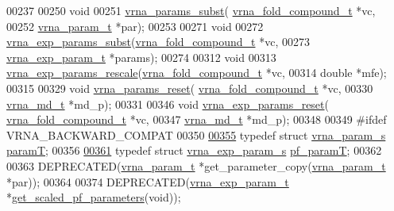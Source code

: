 \begin{DoxyCode}
00237 
00250 \textcolor{keywordtype}{void}
00251 \hyperlink{group__energy__parameters_ga5d1909208f7ea3baa98b75afaa1f62ca}{vrna\_params\_subst}( \hyperlink{group__fold__compound_structvrna__fc__s}{vrna\_fold\_compound\_t} *vc,
00252                     \hyperlink{group__energy__parameters_structvrna__param__s}{vrna\_param\_t} *par);
00253 
00271 \textcolor{keywordtype}{void}
00272 \hyperlink{group__energy__parameters_ga8e7ac4fab3b0cc03afbc134eaafb3525}{vrna\_exp\_params\_subst}(\hyperlink{group__fold__compound_structvrna__fc__s}{vrna\_fold\_compound\_t} *vc,
00273                       \hyperlink{group__energy__parameters_structvrna__exp__param__s}{vrna\_exp\_param\_t} *params);
00274 
00312 \textcolor{keywordtype}{void}
00313 \hyperlink{group__energy__parameters_gad607bc3a5b5da16400e2ca4ea5560233}{vrna\_exp\_params\_rescale}(\hyperlink{group__fold__compound_structvrna__fc__s}{vrna\_fold\_compound\_t} *vc,
00314                         \textcolor{keywordtype}{double} *mfe);
00315 
00329 \textcolor{keywordtype}{void} \hyperlink{group__energy__parameters_gac40dc82e48a72a97cfc58b9da08a7792}{vrna\_params\_reset}( \hyperlink{group__fold__compound_structvrna__fc__s}{vrna\_fold\_compound\_t} *vc,
00330                         \hyperlink{structvrna__md__s}{vrna\_md\_t} *md\_p);
00331 
00346 \textcolor{keywordtype}{void} \hyperlink{group__energy__parameters_gaa5409218068be84d7b50c78fbdaa85a9}{vrna\_exp\_params\_reset}( \hyperlink{group__fold__compound_structvrna__fc__s}{vrna\_fold\_compound\_t} *vc,
00347                             \hyperlink{structvrna__md__s}{vrna\_md\_t} *md\_p);
00348 
00349 \textcolor{preprocessor}{#ifdef  VRNA\_BACKWARD\_COMPAT}
00350 
\hypertarget{params_8h_source.tex_l00355}{}\hyperlink{group__energy__parameters_ga857dde86357d306cc902f0d8b2797659}{00355} \textcolor{keyword}{typedef} \textcolor{keyword}{struct }\hyperlink{group__energy__parameters_structvrna__param__s}{vrna\_param\_s}     \hyperlink{group__energy__parameters_structvrna__param__s}{paramT};
00356 
\hypertarget{params_8h_source.tex_l00361}{}\hyperlink{group__energy__parameters_ga8bffe1828e2cbec101769f5cc0b1535b}{00361} \textcolor{keyword}{typedef} \textcolor{keyword}{struct }\hyperlink{group__energy__parameters_structvrna__exp__param__s}{vrna\_exp\_param\_s} \hyperlink{group__energy__parameters_structvrna__exp__param__s}{pf\_paramT};
00362 
00363 DEPRECATED(\hyperlink{group__energy__parameters_structvrna__param__s}{vrna\_param\_t} *get\_parameter\_copy(\hyperlink{group__energy__parameters_structvrna__param__s}{vrna\_param\_t} *par));
00364 
00374 DEPRECATED(\hyperlink{group__energy__parameters_structvrna__exp__param__s}{vrna\_exp\_param\_t} *\hyperlink{group__energy__parameters_gabf3b9271c41dd3fac02d56e0b02b3344}{get\_scaled\_pf\_parameters}(\textcolor{keywordtype}{void}));

\end{DoxyCode}
